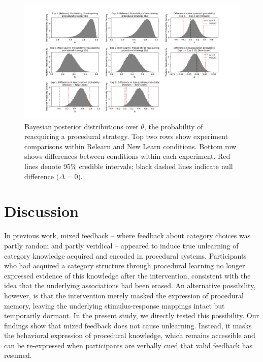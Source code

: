 \documentclass{article}
\begin{document}
\begin{figure}[H]
    \centering
    \includegraphics[width=\textwidth]{../figures/bayesian_comparison.png}
    \caption{
        Bayesian posterior distributions over $\theta$, the
        probability of reacquiring a procedural strategy.
        Top two rows show experiment comparisons within
        Relearn and New Learn conditions. Bottom row shows
        differences between conditions within each
        experiment. Red lines denote 95\% credible
        intervals; black dashed lines indicate null
        difference ($\Delta = 0$).
}
\label{fig_dbm_stats}
\end{figure}

\section{Discussion}
In previous work, mixed feedback -- where feedback about
category choices was partly random and partly veridical --
appeared to induce true unlearning of category knowledge
acquired and encoded in procedural systems.  Participants
who had acquired a category structure through procedural
learning no longer expressed evidence of this knowledge
after the intervention, consistent with the idea that the
underlying associations had been erased. An alternative
possibility, however, is that the intervention merely masked
the expression of procedural memory, leaving the underlying
stimulus-response mappings intact but temporarily dormant.
In the present study, we directly tested this possibility.
Our findings show that mixed feedback does not cause
unlearning. Instead, it masks the behavioral expression of
procedural knowledge, which remains accessible and can be
re-expressed when participants are verbally cued that valid
feedback has resumed.
\end{document}
